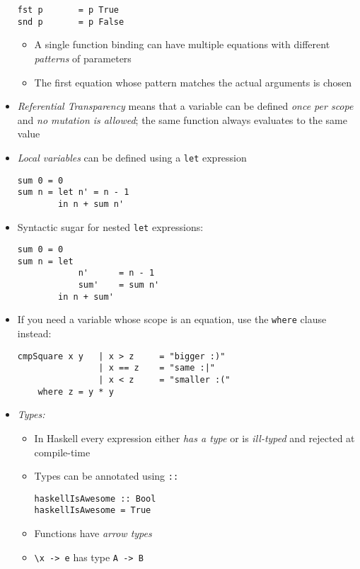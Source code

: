 \documentclass[landscape,8pt]{extarticle}
\newcommand{\code}{\lstinline}
\begin{document}
\begin{multicols}{3}
\begin{itemize}
\begin{lstlisting}
fst p       = p True
snd p       = p False
\end{lstlisting}
              \begin{itemize}
                  \item A single function binding can have multiple equations with different \emph{patterns} of parameters
                  \item The first equation whose pattern matches the actual arguments is chosen
              \end{itemize}
        \item \emph{Referential Transparency} means that a variable can be defined \emph{once per scope} and \emph{no mutation is allowed}; the same function always evaluates to the same value
        \item \emph{Local variables} can be defined using a \code{let} expression
              \begin{lstlisting}
sum 0 = 0
sum n = let n' = n - 1
        in n + sum n'
           \end{lstlisting}
        \item Syntactic sugar for nested \code{let} expressions:
              \begin{lstlisting}
sum 0 = 0
sum n = let
            n'      = n - 1
            sum'    = sum n'
        in n + sum'
           \end{lstlisting}
        \item If you need a variable whose scope is an equation, use the \code{where} clause instead:
              \begin{lstlisting}
cmpSquare x y   | x > z     = "bigger :)"
                | x == z    = "same :|"
                | x < z     = "smaller :("
    where z = y * y
           \end{lstlisting}
        \item \emph{Types:}
              \begin{itemize}
                  \item In Haskell every expression either \emph{has a type} or is \emph{ill-typed} and rejected at compile-time
                  \item Types can be annotated using \code{::}
                        \begin{lstlisting}
haskellIsAwesome :: Bool
haskellIsAwesome = True
               \end{lstlisting}
                  \item Functions have \emph{arrow types}
                  \item \code{\x -> e} has type \code{A -> B}

\end{itemize}
\end{itemize}
\end{multicols}
\end{document}
